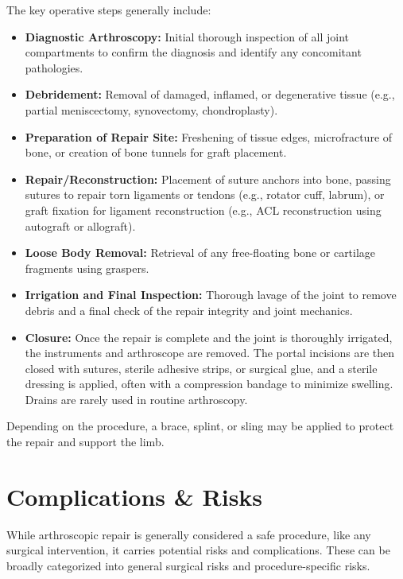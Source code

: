 The key operative steps generally include:
\begin{itemize}
  \item \textbf{Diagnostic Arthroscopy:} Initial thorough inspection of all joint compartments to confirm the diagnosis and identify any concomitant pathologies.
  \item \textbf{Debridement:} Removal of damaged, inflamed, or degenerative tissue (e.g., partial meniscectomy, synovectomy, chondroplasty).
  \item \textbf{Preparation of Repair Site:} Freshening of tissue edges, microfracture of bone, or creation of bone tunnels for graft placement.
  \item \textbf{Repair/Reconstruction:} Placement of suture anchors into bone, passing sutures to repair torn ligaments or tendons (e.g., rotator cuff, labrum), or graft fixation for ligament reconstruction (e.g., ACL reconstruction using autograft or allograft).
  \item \textbf{Loose Body Removal:} Retrieval of any free-floating bone or cartilage fragments using graspers.
  \item \textbf{Irrigation and Final Inspection:} Thorough lavage of the joint to remove debris and a final check of the repair integrity and joint mechanics.
  \item \textbf{Closure:} Once the repair is complete and the joint is thoroughly irrigated, the instruments and arthroscope are removed. The portal incisions are then closed with sutures, sterile adhesive strips, or surgical glue, and a sterile dressing is applied, often with a compression bandage to minimize swelling. Drains are rarely used in routine arthroscopy.
\end{itemize}
Depending on the procedure, a brace, splint, or sling may be applied to protect the repair and support the limb.

\section*{Complications \& Risks}
While arthroscopic repair is generally considered a safe procedure, like any surgical intervention, it carries potential risks and complications. These can be broadly categorized into general surgical risks and procedure-specific risks.

